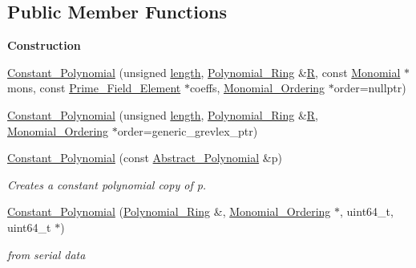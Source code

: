 \subsection*{Public Member Functions}
\begin{Indent}\textbf{ Construction}\par
\begin{DoxyCompactItemize}
\item 
\hyperlink{class_constant___polynomial_a96f87c2544921b04449ef2d92cbec932}{Constant\+\_\+\+Polynomial} (unsigned \hyperlink{class_constant___polynomial_ae1453ef5c898778065be3c3ea2965a10}{length}, \hyperlink{class_polynomial___ring}{Polynomial\+\_\+\+Ring} \&\hyperlink{class_abstract___polynomial_a551ade20b7dcd96c227dd0401f6ffbbe}{R}, const \hyperlink{class_monomial}{Monomial} $\ast$mons, const \hyperlink{class_prime___field___element}{Prime\+\_\+\+Field\+\_\+\+Element} $\ast$coeffs, \hyperlink{class_monomial___ordering}{Monomial\+\_\+\+Ordering} $\ast$order=nullptr)
\item 
\hyperlink{class_constant___polynomial_aeeb86875e964b91cb105f13d8fdf157b}{Constant\+\_\+\+Polynomial} (unsigned \hyperlink{class_constant___polynomial_ae1453ef5c898778065be3c3ea2965a10}{length}, \hyperlink{class_polynomial___ring}{Polynomial\+\_\+\+Ring} \&\hyperlink{class_abstract___polynomial_a551ade20b7dcd96c227dd0401f6ffbbe}{R}, \hyperlink{class_monomial___ordering}{Monomial\+\_\+\+Ordering} $\ast$order=generic\+\_\+grevlex\+\_\+ptr)
\item 
\mbox{\label{class_constant___polynomial_a3e0e3066356e56c7245bb517b4e04284}} 
\hyperlink{class_constant___polynomial_a3e0e3066356e56c7245bb517b4e04284}{Constant\+\_\+\+Polynomial} (const \hyperlink{class_abstract___polynomial}{Abstract\+\_\+\+Polynomial} \&p)
\begin{DoxyCompactList}\small\item\em Creates a constant polynomial copy of p. \end{DoxyCompactList}\item 
\mbox{\label{class_constant___polynomial_a6290a3554fa81bc103f3fdb400dafcc3}} 
\hyperlink{class_constant___polynomial_a6290a3554fa81bc103f3fdb400dafcc3}{Constant\+\_\+\+Polynomial} (\hyperlink{class_polynomial___ring}{Polynomial\+\_\+\+Ring} \&, \hyperlink{class_monomial___ordering}{Monomial\+\_\+\+Ordering} $\ast$, uint64\+\_\+t, uint64\+\_\+t $\ast$)
\begin{DoxyCompactList}\small\item\em from serial data \end{DoxyCompactList}\end{DoxyCompactItemize}
\end{Indent}
